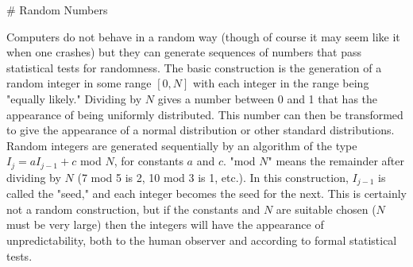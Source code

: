 # Random Numbers


Computers do not behave in a random way (though of course it may seem
like it when one crashes) but they can generate sequences of numbers
that pass statistical tests for randomness. The basic construction is
the generation of a random integer in some range $[0,N]$ with each
integer in the range being "equally likely." Dividing by $N$ gives a
number between 0 and 1 that has the appearance of being uniformly
distributed. This number can then be transformed to give the appearance
of a normal distribution or other standard distributions. Random
integers are generated sequentially by an algorithm of the type
$I_j = aI_{j-1}+c$ mod $N$, for constants $a$ and $c$. "mod $N$" means
the remainder after dividing by $N$ (7 mod 5 is 2, 10 mod 3 is 1, etc.).
In this construction, $I_{j-1}$ is called the "seed," and each integer
becomes the seed for the next. This is certainly not a random
construction, but if the constants and $N$ are suitable chosen ($N$ must
be very large) then the integers will have the appearance of
unpredictability, both to the human observer and according to formal
statistical tests.

